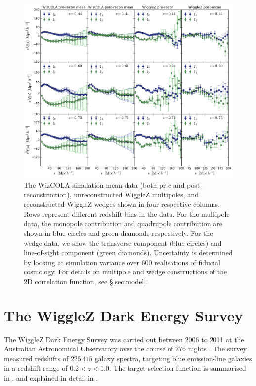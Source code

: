 \documentclass[a4paper,fleqn,usenatbib]{mnras}
\begin{document}
\begin{figure}
	\begin{center}
		\includegraphics[width=\textwidth]{dataplot.pdf}
	\end{center}
	\caption{The WizCOLA simulation mean data \citep{KazinKoda2014,KodaBlake2015} (both pr-e and post-reconstruction), unreconstructed WiggleZ multipoles, and reconstructed WiggleZ wedges shown in four respective columns. Rows represent different redshift bins in the data. For the multipole data, the monopole contribution and quadrupole contribution are shown in blue circles and green diamonds respectively. For the wedge data, we show the transverse component (blue circles) and line-of-sight component (green diamonds). Uncertainty is determined by looking at simulation variance over 600 realisations of fiducial cosmology. For details on multipole and wedge constructions of the 2D correlation function, see \S\ref{sec:model}.}
	\label{fig:wizcola}
\end{figure}


\section{The WiggleZ Dark Energy Survey}\label{sect:wigglez}

The WiggleZ Dark Energy Survey was carried out between 2006 to 2011 at the Australian Astronomical Observatory over the course of 276 nights \citep{Drinkwater2010}. The survey measured redshifts of $225\,415$ galaxy spectra, targeting blue emission-line galaxies in a redshift range of $0.2 < z < 1.0$. The target selection function is summarised in \citet{BlakeDavis2011}, and explained in detail in \citet{BlakeBrough2010}. 
\end{document}
